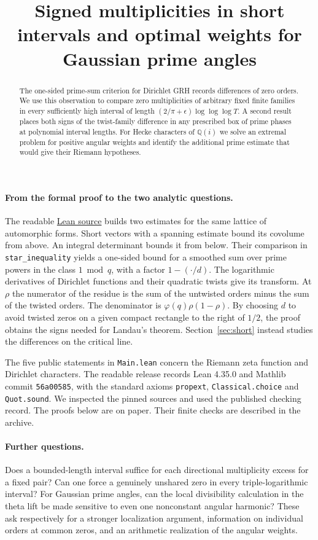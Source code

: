\documentclass[11pt]{article}
\title{Signed multiplicities in short intervals and optimal weights for Gaussian prime angles}
\begin{document}
\maketitle
\begin{abstract}
The one-sided prime-sum criterion for Dirichlet GRH records differences of zero orders. We use this observation to compare zero multiplicities of arbitrary fixed finite families in every sufficiently high interval of length $(2/\pi+\epsilon)\log\log\log T$. A second result places both signs of the twist-family difference in any prescribed box of prime phases at polynomial interval lengths. For Hecke characters of $\mathbb Q(i)$ we solve an extremal problem for positive angular weights and identify the additional prime estimate that would give their Riemann hypotheses.
\end{abstract}

\paragraph{From the formal proof to the two analytic questions.}
The readable \href{https://github.com/lsernau/grh-lean/tree/72fead102f663d5c7a407964a13dc0cf9d977207/grh}{Lean source} builds two estimates for the same lattice of automorphic forms. Short vectors with a spanning estimate bound its covolume from above. An integral determinant bounds it from below. Their comparison in \texttt{star\_inequality} yields a one-sided bound for a smoothed sum over prime powers in the class $1\bmod q$, with a factor $1-(\cdot/d)$. The logarithmic derivatives of Dirichlet functions and their quadratic twists give its transform. At $\rho$ the numerator of the residue is the sum of the untwisted orders minus the sum of the twisted orders. The denominator is $\varphi(q)\rho(1-\rho)$. By choosing $d$ to avoid twisted zeros on a given compact rectangle to the right of $1/2$, the proof obtains the signs needed for Landau's theorem. Section~\ref{sec:short} instead studies the differences on the critical line.

The five public statements in \texttt{Main.lean} concern the Riemann zeta function and Dirichlet characters. The readable release records Lean 4.35.0 and Mathlib commit \texttt{56a00585}, with the standard axioms \texttt{propext}, \texttt{Classical.choice} and \texttt{Quot.sound}. We inspected the pinned sources and used the published checking record. The proofs below are on paper. Their finite checks are described in the archive.



\paragraph{Further questions.}
Does a bounded-length interval suffice for each directional multiplicity excess for a fixed pair? Can one force a genuinely unshared zero in every triple-logarithmic interval? For Gaussian prime angles, can the local divisibility calculation in the theta lift be made sensitive to even one nonconstant angular harmonic? These ask respectively for a stronger localization argument, information on individual orders at common zeros, and an arithmetic realization of the angular weights.
\end{document}
